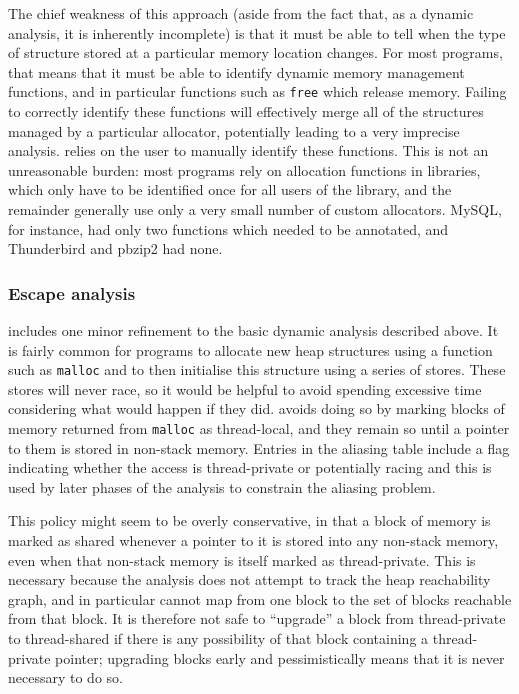 The chief weakness of this approach (aside from the fact that, as a
dynamic analysis, it is inherently incomplete) is that it must be able
to tell when the type of structure stored at a particular memory
location changes.  For most programs, that means that it must be able
to identify dynamic memory management functions, and in particular
functions such as \texttt{free} which release memory.  Failing to
correctly identify these functions will effectively merge all of the
structures managed by a particular allocator, potentially leading to a
very imprecise analysis.  {\Technique} relies on the user to manually
identify these functions.  This is not an unreasonable burden: most
programs rely on allocation functions in libraries, which only have to
be identified once for all users of the library, and the remainder
generally use only a very small number of custom allocators.  MySQL,
for instance, had only two functions which needed to be annotated, and
Thunderbird and pbzip2 had none.

\subsubsection{Escape analysis}
{\Implementation} includes one minor refinement to the basic dynamic
analysis described above.  It is fairly common for programs to
allocate new heap structures using a function such as \texttt{malloc}
and to then initialise this structure using a series of stores.  These
stores will never race, so it would be helpful to avoid spending
excessive time considering what would happen if they did.
{\Technique} avoids doing so by marking blocks of memory returned from
\texttt{malloc} as thread-local, and they remain so until a pointer to
them is stored in non-stack memory.  Entries in the aliasing table
include a flag indicating whether the access is thread-private or
potentially racing and this is used by later phases of the analysis to
constrain the aliasing problem.

This policy might seem to be overly conservative, in that a block of
memory is marked as shared whenever a pointer to it is stored into any
non-stack memory, even when that non-stack memory is itself marked as
thread-private.  This is necessary because the analysis does not
attempt to track the heap reachability graph, and in particular cannot
map from one block to the set of blocks reachable from that block.  It
is therefore not safe to ``upgrade'' a block from thread-private to
thread-shared if there is any possibility of that block containing a
thread-private pointer; upgrading blocks early and pessimistically
means that it is never necessary to do so.

